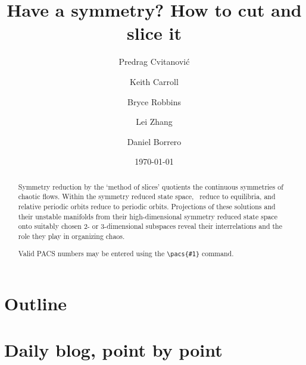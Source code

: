 \documentclass[twocolumn,
secnumarabic,
nofootinbib, tightenlines,
nobibnotes, showkeys, aps,
cha]{revtex4-1}
\begin{document}
\title[How to cut and slice a symmetry]
{Have a symmetry? How to cut and slice it}


\author{Predrag Cvitanovi{\'c}}
\author{Keith Carroll}
\author{Bryce Robbins}
\author{Lei Zhang}
\author{Daniel Borrero}

\date{\today}

\begin{abstract}
Symmetry reduction by the `method of slices'
quotients the continuous symmetries of chaotic flows. Within the
symmetry reduced state space, \reqva\ reduce to
equilibria, and relative periodic orbits reduce to periodic orbits.
Projections of these solutions and their unstable manifolds from their
high-dimensional symmetry reduced state space onto suitably chosen 2-
or 3-dimensional subspaces reveal their interrelations and the role they
play in organizing chaos.

%
Valid PACS numbers may be entered using the \verb+\pacs{#1}+ command.
\end{abstract}

\maketitle








% 


\ifdraft
    \onecolumngrid
    \newpage
    \section{Outline}
    \label{chap:outline}


    \newpage


    \newpage
    \section{Daily blog, point by point}
    \label{chap:atlas}

\fi
\end{document}
